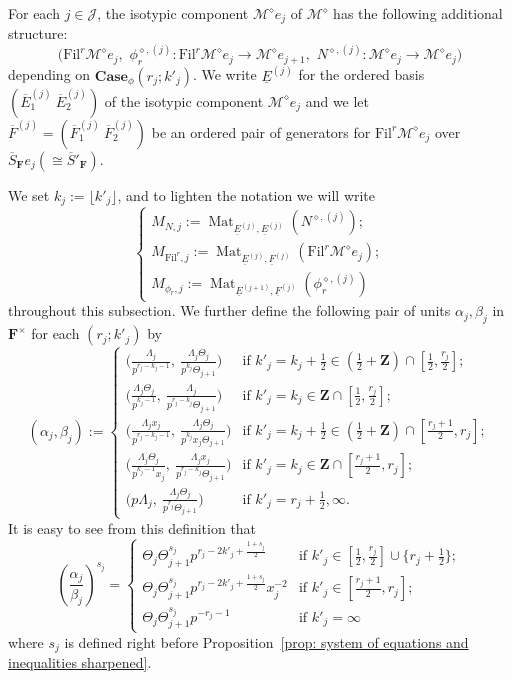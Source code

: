 \documentclass[11pt]{amsart}
\theoremstyle{definition}
\numberwithin{equation}{subsection}
\theoremstyle{plain}
\theoremstyle{plain}
\theoremstyle{plain}
\theoremstyle{plain}
\theoremstyle{plain}
\theoremstyle{plain}
\theoremstyle{plain}
\theoremstyle{plain}
\theoremstyle{plain}
\theoremstyle{plain}
\theoremstyle{plain}
\theoremstyle{plain}
\theoremstyle{definition}
\theoremstyle{definition}
\theoremstyle{definition}
\theoremstyle{remark}
\renewcommand{\(}{\textup{(}}
\renewcommand{\)}{\textup{)}}
\DeclareMathOperator{\Mat}{Mat}
\newcommand{\Z}{\mathbf{Z}}
\newcommand{\F}{\mathbf{F}}
\newcommand{\barS}{\overline{S}}
\newcommand{\cM}{\mathcal{M}}
\newcommand{\Fil}{\mathrm{Fil}}
\newcommand{\cJ}{\mathcal{J}}
\newcommand{\barE}{\overline{E}}
\newcommand{\barF}{\overline{F}}
\newcommand{\baseE}{\underline{E}}
\newcommand{\baseF}{\underline{F}}
\begin{document}
For each $j\in\cJ$, the isotypic component $\cM^\diamond e_j$ of $\cM^\diamond$ has the following additional structure:
$$\big(\Fil^r\cM^\diamond e_j,\,\,\phi_r^{\diamond,(j)}:\Fil^r\cM^\diamond e_j\rightarrow\cM^\diamond e_{j+1},\,\,N^{\diamond,(j)}:\cM^\diamond e_j\rightarrow \cM^\diamond e_j\big)$$ depending on $\mathbf{Case}_\phi(r_j;k'_j)$. We write $\baseE^{(j)}$ for the ordered basis $(\barE_1^{(j)}\ \barE_2^{(j)})$ of the isotypic component $\cM^\diamond e_j$ and we let $\barF^{(j)}=(\barF_1^{(j)}\ \barF_2^{(j)})$ be an ordered pair of generators for $\Fil^r\cM^\diamond e_j$ over $\barS_\F e_j(\cong\barS'_\F)$.

We set $k_j:=\lfloor k'_j \rfloor$, and to lighten the notation we will write
$$
\begin{cases}
M_{N,j}:=\Mat_{\baseE^{(j)},\baseE^{(j)}}(N^{\diamond,(j)});\\
M_{\Fil^r,j}:=\Mat_{\baseE^{(j)},\baseF^{(j)}}(\Fil^r\cM^\diamond e_j);\\
M_{\phi_r,j}:=\Mat_{\baseE^{(j+1)},\baseF^{(j)}}(\phi_r^{\diamond,(j)})
\end{cases}
$$
throughout this subsection. We further define the following pair of units $\alpha_j,\beta_j$ in $\F^\times$ for each $(r_j;k'_j)$ by
$$
(\alpha_j,\beta_j):=
\begin{cases}
    \big( \frac{\Lambda_j}{p^{r_j-k_j-1}},\ \frac{\Lambda_j\Theta_j}{p^{k_j}\Theta_{j+1}} \big)
     & \mbox{if } k'_j=k_j+\tfrac{1}{2}\in(\tfrac{1}{2}+\Z)\cap[\frac{1}{2},\tfrac{r_j}{2}]; \\
    \big( \frac{\Lambda_j\Theta_j}{p^{k_j-1}},\ \frac{\Lambda_j}{p^{r_j-k_j}\Theta_{j+1}} \big)
     & \mbox{if } k'_j=k_j\in\Z\cap[\frac{1}{2},\tfrac{r_j}{2}]; \\
    \big( \frac{\Lambda_jx_j}{p^{r_j-k_j-1}},\ \frac{\Lambda_j\Theta_j}{p^{k_j}x_j\Theta_{j+1}} \big)
     & \mbox{if } k'_j=k_j+\tfrac{1}{2}\in(\tfrac{1}{2}+\Z)\cap[\tfrac{r_j+1}{2},r_j]; \\
    \big( \frac{\Lambda_j\Theta_j}{p^{k_j-1}x_j},\ \frac{\Lambda_jx_j}{p^{r_j-k_j}\Theta_{j+1}} \big)
     & \mbox{if } k'_j=k_j\in\Z\cap[\tfrac{r_j+1}{2},r_j];\\
    \big( p\Lambda_j,\ \frac{\Lambda_j\Theta_j}{p^{r_j}\Theta_{j+1}} \big)
     & \mbox{if }k'_j=r_j+\frac{1}{2},\infty.
    \end{cases}
$$
It is easy to see from this definition that
\begin{equation}\label{eq: alpha_j/beta_j}
\left(\frac{\alpha_j}{\beta_j}\right)^{s_j}=
\begin{cases}
  \Theta_j\Theta_{j+1}^{s_j}p^{r_j-2k'_j+\frac{1+s_j}{2}} & \mbox{if } k'_j\in [\frac{1}{2},\frac{r_j}{2}]\cup\{r_j+\frac{1}{2}\};\\
  \Theta_j\Theta_{j+1}^{s_j}p^{r_j-2k'_j+\frac{1+s_j}{2}}x_j^{-2} & \mbox{if } k'_j\in [\frac{r_j+1}{2},r_j];\\
 \Theta_j\Theta_{j+1}^{s_j}p^{-r_j-1} & \mbox{if } k'_j=\infty
\end{cases}
\end{equation}
where $s_j$ is defined right before Proposition~\ref{prop: system of equations and inequalities sharpened}.
\end{document}
